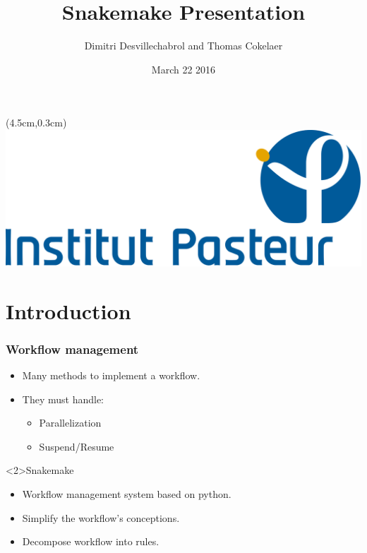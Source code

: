 \documentclass{beamer}
\title{Snakemake Presentation}
\author[D.Desvillechabrol \& T.Cokelaer]{Dimitri Desvillechabrol and Thomas Cokelaer}
\institute{Institut Pasteur}
\date{March 22 2016}
\begin{document}

\begin{frame}[plain]
    \titlepage
    \begin{textblock*}{5cm}(4.5cm,0.3cm)
        \includegraphics[scale=0.09]{Institut_Pasteur.png}
    \end{textblock*}
\end{frame}


\section{Introduction}

\begin{frame}
    \frametitle{Workflow management}
    \begin{itemize}
        \item Many methods to implement a workflow.
        \item They must handle:
            \begin{itemize}
                \item Parallelization
                \item Suspend/Resume
            \end{itemize}
    \end{itemize}
    \begin{block}<2>{Snakemake}
        \begin{itemize}
            \item Workflow management system based on python.
            \item Simplify the workflow's conceptions.
            \item Decompose workflow into rules.
        \end{itemize} 
    \end{block}
\end{frame}
\end{document}
